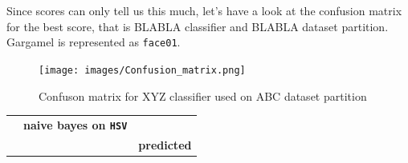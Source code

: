 \documentclass[12pt,a4paper]{article}
\begin{document}
     Since scores can only tell us this much, let's have a look at the confusion matrix for the best score, that is BLABLA classifier and BLABLA dataset partition. Gargamel is represented as \texttt{face01}.

    \begin{figure}[H]
		\centering
		\texttt{[image: images/Confusion\_matrix.png]}
		\caption{Confuson matrix for XYZ classifier used on ABC dataset partition}
    \end{figure}

     \begin{center}
        {\footnotesize
		\begin{tabular}{|c c c c c c c c c c c c c c c c c c c c c c c|}
			\hline
			\multicolumn{1}{|c}{} & \multicolumn{21}{c}{\multirow{2}{*}{\textbf{\large naive bayes on \texttt{HSV}}}} & \multicolumn{1}{c|}{}\\
			\multicolumn{1}{|c}{} & & & & & & & & & & & & & & & & & & & & & & \multicolumn{1}{c|}{}\\
			\hline
				& & \multicolumn{21}{|c|}{\textbf{predicted}} \\

\end{tabular}}
\end{center}
\end{document}
